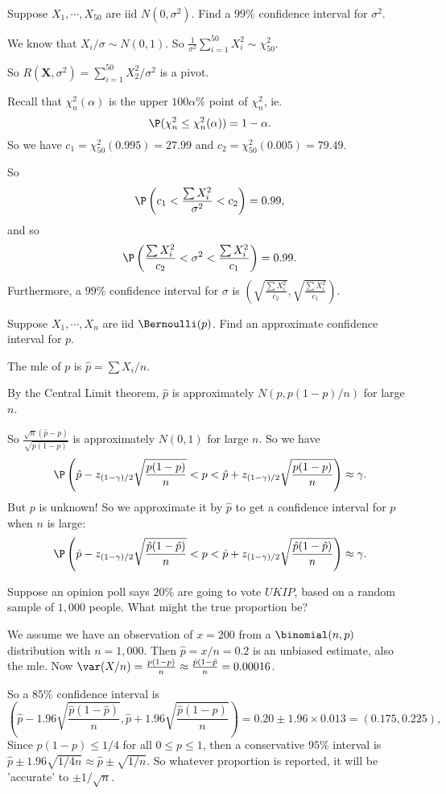 \documentclass[a4paper]{article}
\begin{document}
\begin{eg}
  Suppose $X_1, \cdots, X_{50}$ are iid $N(0, \sigma^2)$. Find a $99\%$ confidence interval for $\sigma^2$.

  We know that $X_i/\sigma \sim N(0, 1)$. So $\displaystyle\frac{1}{\sigma^2}\sum_{i = 1}^{50}X_i^2 \sim \chi^2_{50}$.

  So $R(\mathbf{X}, \sigma^2) = \sum_{i = 1}^{50} X_2^2/\sigma^2$ is a pivot.

  Recall that $\chi_n^2(\alpha)$ is the upper $100\alpha\%$ point of $\chi_n^2$, ie.
  \[
    \P(\chi_n^2 \leq \chi_n^2(\alpha)) = 1 - \alpha.
  \]
  So we have $c_1 = \chi_{50}^2(0.995) = 27.99$ and $c_2 = \chi_{50}^2(0.005) = 79.49$.

  So
  \[
    \P \left(c_1 < \frac{\sum X_i^2}{\sigma^2} < c_2\right) = 0.99,
  \]
  and so
  \[
    \P\left(\frac{\sum X_i^2}{c_2} < \sigma^2 < \frac{\sum X_i^2}{c_1}\right) = 0.99.
  \]
  Furthermore, a $99\%$ confidence interval for $\sigma$ is $\left(\sqrt{\frac{\sum X_i^2}{c_2}}, \sqrt{\frac{\sum X_i^2}{c_1}}\right)$.
\end{eg}

\begin{eg}
  Suppose $X_1, \cdots, X_n$ are iid $\Bernoulli(p)$. Find an approximate confidence interval for $p$.

  The mle of $p$ is $\hat p = \sum X_i/n$.

  By the Central Limit theorem, $\hat{p}$ is approximately $N(p, p(1 - p)/n)$ for large $n$.

  So $\displaystyle \frac{\sqrt{n}(\hat{p} - p)}{\sqrt{p(1 - p)}}$ is approximately $N(0, 1)$ for large $n$. So we have
  \[
    \P\left(\hat p - z_{(1 - \gamma)/2}\sqrt{\frac{p(1 - p)}{n}} < p < \hat{p} + z_{(1 - \gamma)/2}\sqrt{\frac{p(1 - p)}{n}}\right)\approx \gamma.
  \]
  But $p$ is unknown! So we approximate it by $\hat{p}$ to get a confidence interval for $p$ when $n$ is large:
  \[
    \P\left(\hat p - z_{(1 - \gamma)/2}\sqrt{\frac{\hat p(1 - \hat p)}{n}} < p < \hat{p} + z_{(1 - \gamma)/2}\sqrt{\frac{\hat p(1 - \hat p)}{n}}\right)\approx \gamma.
  \]
\end{eg}

\begin{eg}
  Suppose an opinion poll says $20\%$ are going to vote $UKIP$, based on a random sample of $1,000$ people. What might the true proportion be?

  We assume we have an observation of $x = 200$ from a $\binomial(n, p)$ distribution with $n = 1,000$. Then $\hat p = x/n = 0.2$ is an unbiased estimate, also the mle. 
  Now $\var(X/n) = \frac{p(1 - p)}{n}\approx \frac{\hat p(1 - \hat p}{n} = 0.00016$.

  So a $85\%$ confidence interval is
  \[
    \left(\hat p - 1.96\sqrt{\frac{\hat p(1 - \hat p)}{n}}, \hat p + 1.96\sqrt{\frac{\hat p(1 - \hat p)}{n}}\right) = 0.20 \pm 1.96\times 0.013 = (0.175, 0.225),
  \]
  \note Since $p(1 - p)\leq 1/4$ for all $0 \leq p \leq 1$, then a conservative $95\%$ interval is $\hat p \pm 1.96\sqrt{1/4n} \approx \hat p \pm \sqrt{1/n}$. So whatever proportion is reported, it will be 'accurate' to $\pm 1/\sqrt{n}$. 
\end{eg}
\end{document}
